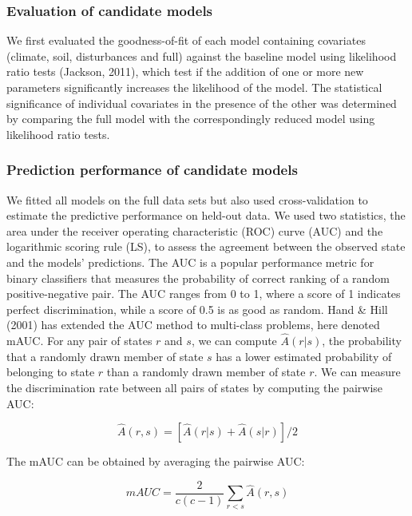 \documentclass[a4paperpaper,]{article}
\begin{document}
\hypertarget{evaluation-of-candidate-models}{%
\subsubsection{Evaluation of candidate
models}\label{evaluation-of-candidate-models}}

We first evaluated the goodness-of-fit of each model containing
covariates (climate, soil, disturbances and full) against the baseline
model using likelihood ratio tests (Jackson, 2011), which test if the
addition of one or more new parameters significantly increases the
likelihood of the model. The statistical significance of individual
covariates in the presence of the other was determined by comparing the
full model with the correspondingly reduced model using likelihood ratio
tests.

\hypertarget{prediction-performance-of-candidate-models}{%
\subsubsection{Prediction performance of candidate
models}\label{prediction-performance-of-candidate-models}}

We fitted all models on the full data sets but also used
cross-validation to estimate the predictive performance on held-out
data. We used two statistics, the area under the receiver operating
characteristic (ROC) curve (AUC) and the logarithmic scoring rule (LS),
to assess the agreement between the observed state and the models'
predictions. The AUC is a popular performance metric for binary
classifiers that measures the probability of correct ranking of a random
positive-negative pair. The AUC ranges from 0 to 1, where a score of 1
indicates perfect discrimination, while a score of 0.5 is as good as
random. Hand \& Hill (2001) has extended the AUC method to multi-class
problems, here denoted mAUC. For any pair of states \(r\) and \(s\), we
can compute \(\hat{A}(r|s)\), the probability that a randomly drawn
member of state \(s\) has a lower estimated probability of belonging to
state \(r\) than a randomly drawn member of state \(r\). We can measure
the discrimination rate between all pairs of states by computing the
pairwise AUC:

\[\hat{A}(r,s) = [\hat{A}(r|s)+ \hat{A}(s|r)]/2\]

The mAUC can be obtained by averaging the pairwise AUC:

\[mAUC = \frac{2}{c(c-1)} \sum_{r<s} \hat{A}(r,s)\]
\end{document}
